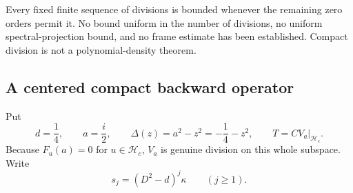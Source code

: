 \documentclass[11pt,a4paper]{article}
\numberwithin{equation}{section}
\theoremstyle{definition}\newtheorem{definition}[theorem]{Definition}
\theoremstyle{remark}\newtheorem{remark}[theorem]{Remark}
\newcommand{\Hh}{\mathcal H}\newcommand{\Hw}{\mathcal H}
\begin{document}
Every fixed finite sequence of divisions is bounded whenever the remaining zero orders permit it. No bound uniform in the number of divisions, no uniform spectral-projection bound, and no frame estimate has been established. Compact division is not a polynomial-density theorem.

\subsection{A centered compact backward operator}\label{d:sec:model}

Put
\begin{equation}\label{d:eq:d-delta-T}
 d=\frac14,\qquad a=\frac i2,\qquad
 \Delta(z)=a^2-z^2=-\frac14-z^2,\qquad
 T=CV_a|_{\Hh_c}.
\end{equation}
Because $F_u(a)=0$ for $u\in\Hh_c$, $V_a$ is genuine division on this whole subspace. Write
\begin{equation}\label{d:eq:sj}
 s_j=(D^2-d)^j\kappa\qquad(j\ge1).
\end{equation}
\end{document}
